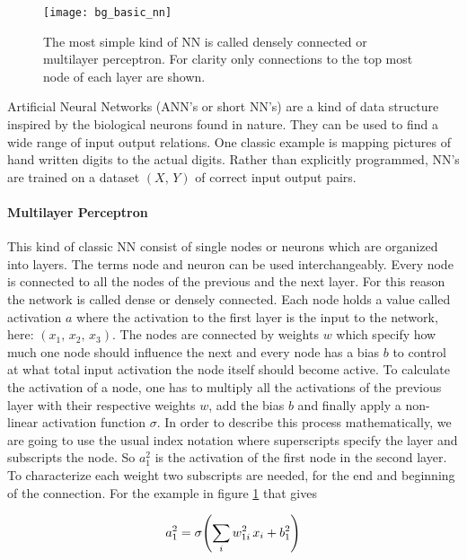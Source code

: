 \begin{figure}[H]
    \centering
    \texttt{[image: bg\_basic\_nn]}
    \caption{The most simple kind of NN is called densely connected or multilayer perceptron. For clarity only connections to the top most node of each layer are shown.}
    \label{fig:bg:basic_nn}
\end{figure}

Artificial Neural Networks (ANN's or short NN's) are a kind of data structure inspired by the biological neurons found in nature. They can be used to find a wide range of input output relations. One classic example is mapping pictures of hand written digits to the actual digits. Rather than explicitly programmed, NN's are trained on a dataset $(X, \, Y)$ of correct input output pairs.


\paragraph{Multilayer Perceptron}
This kind of classic NN consist of single nodes or neurons which are organized into layers. The terms node and neuron can be used interchangeably. Every node is connected to all the nodes of the previous and the next layer. For this reason the network is called dense or densely connected. Each node holds a value called activation $a$ where the activation to the first layer is the input to the network, here:
$(x_1, \, x_2, \, x_3)$.
The nodes are connected by weights $w$ which specify how much one node should influence the next and every node has a bias $b$ to control at what total input activation the node itself should become active.
To calculate the activation of a node, one has to multiply all the activations of the previous layer with their respective weights $w$, add the bias $b$ and finally apply a non-linear activation function $\sigma$.
In order to describe this process mathematically, we are going to use the usual index notation where superscripts specify the layer and subscripts the node. So $a^2_1$ is the activation of the first node in the second layer. To characterize each weight two subscripts are needed, for the end and beginning of the connection. For the example in figure \ref{fig:bg:basic_nn} that gives

\begin{equation} \label{eq:bg:activation_example}
    a^2_1 = \sigma \qty(\sum_i w^2_{1i} \, x_i + b^2_1)
\end{equation}

